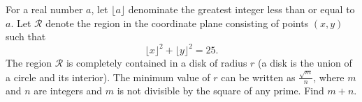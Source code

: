 For a real number $ a$, let $ \lfloor a \rfloor$ denominate the greatest integer less than or equal to $ a$. Let $ \mathcal{R}$ denote the region in the coordinate plane consisting of points $ (x,y)$ such that \[\lfloor x \rfloor ^2 + \lfloor y \rfloor ^2 = 25.\]The region $ \mathcal{R}$ is completely contained in a disk of radius $ r$ (a disk is the union of a circle and its interior). The minimum value of $ r$ can be written as $ \tfrac {\sqrt {m}}{n}$, where $ m$ and $ n$ are integers and $ m$ is not divisible by the square of any prime. Find $ m + n$.